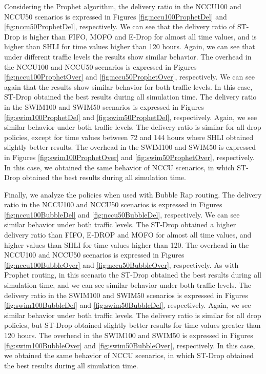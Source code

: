 Considering the Prophet algorithm, the delivery ratio in the NCCU100 and NCCU50 scenarios is expressed in Figures \ref{fig:nccu100ProphetDel} and \ref{fig:nccu50ProphetDel}, respectively. We can see that the delivery ratio of ST-Drop is higher than FIFO, MOFO and E-Drop for almost all time values, and is higher than SHLI for time values higher than 120 hours. Again, we can see that under different traffic levels the results show similar behavior. The overhead in the NCCU100 and NCCU50 scenarios is expressed in Figures \ref{fig:nccu100ProphetOver} and \ref{fig:nccu50ProphetOver}, respectively. We can see again that the results show similar behavior for both traffic levels. In this case, ST-Drop obtained the best results during all simulation time. The delivery ratio in the SWIM100 and SWIM50 scenarios is expressed in Figures \ref{fig:swim100ProphetDel} and \ref{fig:swim50ProphetDel}, respectively. Again, we see similar behavior under both traffic levels. The delivery ratio is similar for all drop policies, except for time values between 72 and 144 hours where SHLI obtained slightly better results. The overhead in the SWIM100 and SWIM50 is expressed in Figures \ref{fig:swim100ProphetOver} and \ref{fig:swim50ProphetOver}, respectively. In this case, we obtained the same behavior of NCCU scenarios, in which ST-Drop obtained the best results during all simulation time.

Finally, we analyze the policies when used with Bubble Rap routing. The delivery ratio in the NCCU100 and NCCU50 scenarios is expressed in Figures \ref{fig:nccu100BubbleDel} and \ref{fig:nccu50BubbleDel}, respectively. We can see similar behavior under both traffic levels. The ST-Drop obtained a higher delivery ratio than FIFO, E-DROP and MOFO for almost all time values, and higher values than SHLI for time values higher than 120. The overhead in the NCCU100 and NCCU50 scenarios is expressed in Figures \ref{fig:nccu100BubbleOver} and \ref{fig:nccu50BubbleOver}, respectively. As with Prophet routing, in this scenario the ST-Drop obtained the best results during all simulation time, and we can see similar behavior under both traffic levels. The delivery ratio in the SWIM100 and SWIM50 scenarios is expressed in Figures \ref{fig:swim100BubbleDel} and \ref{fig:swim50BubbleDel}, respectively. Again, we see similar behavior under both traffic levels. The delivery ratio is similar for all drop policies, but ST-Drop obtained slightly better results for time values greater than 120 hours. The overhead in the SWIM100 and SWIM50 is expressed in Figures \ref{fig:swim100BubbleOver} and \ref{fig:swim50BubbleOver}, respectively. In this case, we obtained the same behavior of NCCU scenarios, in which ST-Drop obtained the best
results during all simulation time.

